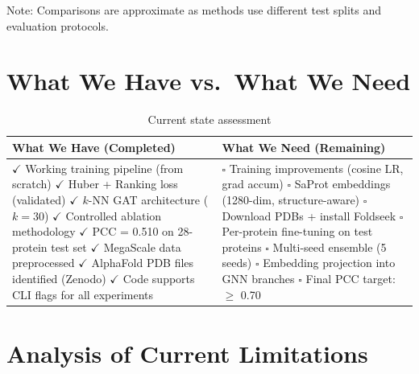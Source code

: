 Note: Comparisons are approximate as methods use different test splits and evaluation protocols.

\section{What We Have vs.\ What We Need}

\begin{table}[h]
\centering
\caption{Current state assessment}
\label{tab:state}
\begin{tabular}{p{6cm}p{6cm}}
\toprule
\textbf{What We Have (Completed)} & \textbf{What We Need (Remaining)} \\
\midrule
\vspace{0.1cm}
$\checkmark$ Working training pipeline (from scratch) \newline
$\checkmark$ Huber + Ranking loss (validated) \newline
$\checkmark$ $k$-NN GAT architecture ($k=30$) \newline
$\checkmark$ Controlled ablation methodology \newline
$\checkmark$ PCC = 0.510 on 28-protein test set \newline
$\checkmark$ MegaScale data preprocessed \newline
$\checkmark$ AlphaFold PDB files identified (Zenodo) \newline
$\checkmark$ Code supports CLI flags for all experiments
&
\vspace{0.1cm}
$\square$ Training improvements (cosine LR, grad accum) \newline
$\square$ SaProt embeddings (1280-dim, structure-aware) \newline
$\square$ Download PDBs + install Foldseek \newline
$\square$ Per-protein fine-tuning on test proteins \newline
$\square$ Multi-seed ensemble (5 seeds) \newline
$\square$ Embedding projection into GNN branches \newline
$\square$ Final PCC target: $\geq$ 0.70
\\
\bottomrule
\end{tabular}
\end{table}

\section{Analysis of Current Limitations}

